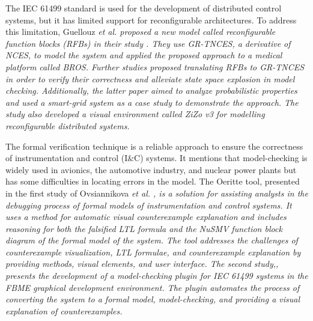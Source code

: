 \documentclass[runningheads]{llncs}
\newcommand{\etal}{\it et al. \normalfont}
\begin{document}
The IEC 61499 standard is used for the development of distributed control systems, but it has limited support for reconfigurable architectures. To address this limitation, Guellouz \etal  proposed a new model called reconfigurable function blocks (RFBs) in their study \cite{guellouz2016reconfigurable}. They use GR-TNCES, a derivative of NCES, to model the system and applied the proposed approach to a medical platform called BROS. Further studies \cite{guellouz2018designing, fkaier2021modeling} proposed translating RFBs to GR-TNCES in order to verify their correctness and alleviate state space explosion in model checking. Additionally, the latter paper aimed to analyze probabilistic properties and used a smart-grid system as a case study to demonstrate the approach. The study also developed a visual environment called ZiZo v3 for modelling reconfigurable distributed systems.

 The formal verification technique is a reliable approach to ensure the correctness of instrumentation and control (I\&C) systems. It mentions that model-checking is widely used in avionics, the automotive industry, and nuclear power plants but has some  difficulties in locating errors in the model. The Oeritte tool, presented in the first study of Ovsiannikova \etal \cite{ovsiannikova2021oeritte}, is a solution for assisting analysts in the debugging process of formal models of instrumentation and control systems. It uses a method for automatic visual counterexample explanation and includes reasoning for both the falsified LTL formula and the NuSMV function block diagram of the formal model of the system. The tool addresses the challenges of counterexample visualization, LTL formulae, and counterexample explanation by providing methods, visual elements, and user interface. The second study,\cite{ovsiannikova2021towards}, presents the development of a model-checking plugin for IEC 61499 systems in the FBME graphical development environment. The plugin automates the process of converting the system to a formal model, model-checking, and providing a visual explanation of counterexamples.
\end{document}
